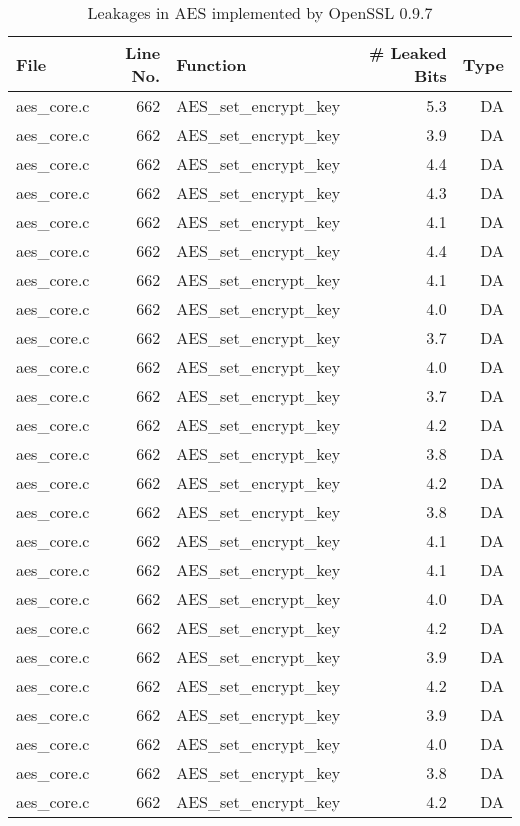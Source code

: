 \begin{table}[h!]
\centering\tiny\scriptsize
\caption{Leakages in AES implemented by OpenSSL 0.9.7}\label{tab:AESOpenSSL0.9.7}
\begin{tabular}{lrlrr}
\hline
\textbf{File} & \textbf{Line No.} & \textbf{Function} & \textbf{\# Leaked Bits} & \textbf{Type} \\\hline
aes\_core.c& 662&AES\_set\_encrypt\_key&5.3 &DA\\
aes\_core.c& 662&AES\_set\_encrypt\_key&3.9 &DA\\
aes\_core.c& 662&AES\_set\_encrypt\_key&4.4 &DA\\
aes\_core.c& 662&AES\_set\_encrypt\_key&4.3 &DA\\
aes\_core.c& 662&AES\_set\_encrypt\_key&4.1 &DA\\
aes\_core.c& 662&AES\_set\_encrypt\_key&4.4 &DA\\
aes\_core.c& 662&AES\_set\_encrypt\_key&4.1 &DA\\
aes\_core.c& 662&AES\_set\_encrypt\_key&4.0 &DA\\
aes\_core.c& 662&AES\_set\_encrypt\_key&3.7 &DA\\
aes\_core.c& 662&AES\_set\_encrypt\_key&4.0 &DA\\
aes\_core.c& 662&AES\_set\_encrypt\_key&3.7 &DA\\
aes\_core.c& 662&AES\_set\_encrypt\_key&4.2 &DA\\
aes\_core.c& 662&AES\_set\_encrypt\_key&3.8 &DA\\
aes\_core.c& 662&AES\_set\_encrypt\_key&4.2 &DA\\
aes\_core.c& 662&AES\_set\_encrypt\_key&3.8 &DA\\
aes\_core.c& 662&AES\_set\_encrypt\_key&4.1 &DA\\
aes\_core.c& 662&AES\_set\_encrypt\_key&4.1 &DA\\
aes\_core.c& 662&AES\_set\_encrypt\_key&4.0 &DA\\
aes\_core.c& 662&AES\_set\_encrypt\_key&4.2 &DA\\
aes\_core.c& 662&AES\_set\_encrypt\_key&3.9 &DA\\
aes\_core.c& 662&AES\_set\_encrypt\_key&4.2 &DA\\
aes\_core.c& 662&AES\_set\_encrypt\_key&3.9 &DA\\
aes\_core.c& 662&AES\_set\_encrypt\_key&4.0 &DA\\
aes\_core.c& 662&AES\_set\_encrypt\_key&3.8 &DA\\
aes\_core.c& 662&AES\_set\_encrypt\_key&4.2 &DA\\

\end{tabular}
\end{table}
